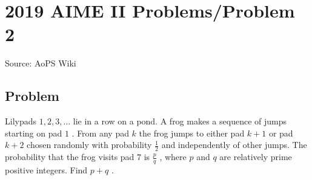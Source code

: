\documentclass[12pt]{article}
\begin{document}
\section*{{2019 AIME II Problems/Problem 2}}
Source: AoPS Wiki

\subsection*{Problem}
Lilypads $1,2,3,\ldots$ lie in a row on a pond. A frog makes a sequence of jumps starting on pad $1$ . From any pad $k$ the frog jumps to either pad $k+1$ or pad $k+2$ chosen randomly with probability $\tfrac{1}{2}$ and independently of other jumps. The probability that the frog visits pad $7$ is $\tfrac{p}{q}$ , where $p$ and $q$ are relatively prime positive integers. Find $p+q$ .
\end{document}
